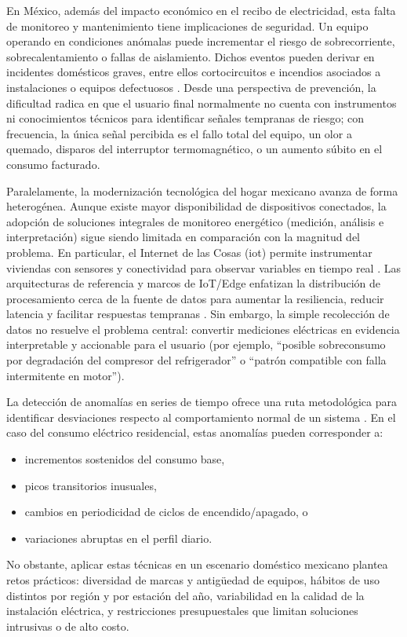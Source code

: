 ﻿\documentclass[12pt,openright,oneside]{report}
\theoremstyle{mytheoremstyle}
\theoremstyle{mytheoremstyle}
\theoremstyle{myproblemstyle}
\begin{document}
En México, además del impacto económico en el recibo de electricidad, esta falta de monitoreo y mantenimiento tiene implicaciones de seguridad. Un equipo operando en condiciones anómalas puede incrementar el riesgo de sobrecorriente, sobrecalentamiento o fallas de aislamiento. Dichos eventos pueden derivar en incidentes domésticos graves, entre ellos cortocircuitos e incendios asociados a instalaciones o equipos defectuosos \cite{proteccion-civil-incendios-vivienda,nom-electricidad-instalaciones}. Desde una perspectiva de prevención, la dificultad radica en que el usuario final normalmente no cuenta con instrumentos ni conocimientos técnicos para identificar señales tempranas de riesgo; con frecuencia, la única señal percibida es el fallo total del equipo, un olor a quemado, disparos del interruptor termomagnético, o un aumento súbito en el consumo facturado.

Paralelamente, la modernización tecnológica del hogar mexicano avanza de forma heterogénea. Aunque existe mayor disponibilidad de dispositivos conectados, la adopción de soluciones integrales de monitoreo energético (medición, análisis e interpretación) sigue siendo limitada en comparación con la magnitud del problema. En particular, el Internet de las Cosas (\gls{iot}) permite instrumentar viviendas con sensores y conectividad para observar variables en tiempo real \cite{nist-sp800-183}. Las arquitecturas de referencia y marcos de IoT/Edge enfatizan la distribución de procesamiento cerca de la fuente de datos para aumentar la resiliencia, reducir latencia y facilitar respuestas tempranas \cite{iota-arm-2013,iic-iira-2019,rami4-0,shi2016edge,satyanarayanan2017}. Sin embargo, la simple recolección de datos no resuelve el problema central: convertir mediciones eléctricas en evidencia interpretable y accionable para el usuario (por ejemplo, ``posible sobreconsumo por degradación del compresor del refrigerador'' o ``patrón compatible con falla intermitente en motor'').

La detección de anomalías en series de tiempo ofrece una ruta metodológica para identificar desviaciones respecto al comportamiento normal de un sistema \cite{malhotra2015,laptev2015}. En el caso del consumo eléctrico residencial, estas anomalías pueden corresponder a:
\begin{itemize}
    \item incrementos sostenidos del consumo base,
    \item picos transitorios inusuales,
    \item cambios en periodicidad de ciclos de encendido/apagado, o
    \item variaciones abruptas en el perfil diario.
\end{itemize}
No obstante, aplicar estas técnicas en un escenario doméstico mexicano plantea retos prácticos: diversidad de marcas y antigüedad de equipos, hábitos de uso distintos por región y por estación del año, variabilidad en la calidad de la instalación eléctrica, y restricciones presupuestales que limitan soluciones intrusivas o de alto costo.
\end{document}
